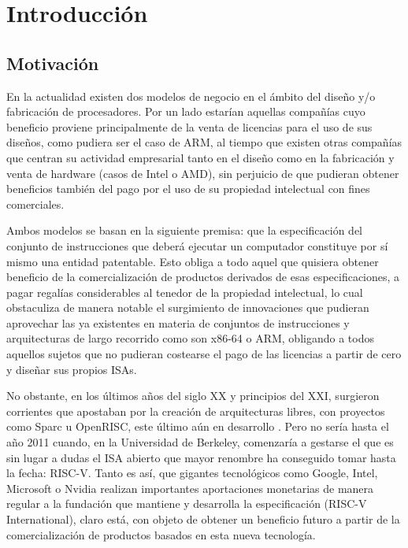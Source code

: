 \chapter{Introducción}


\section{Motivación}

En la actualidad existen dos modelos de negocio en el ámbito del diseño y/o fabricación de procesadores. Por un lado estarían aquellas compañías cuyo beneficio proviene principalmente de la venta de licencias para el uso de sus diseños, como pudiera ser el caso de ARM, al tiempo que existen otras compañías que centran su actividad empresarial tanto en el diseño como en la fabricación y venta de hardware (casos de Intel o AMD), sin perjuicio de que pudieran obtener beneficios también del pago por el uso de su propiedad intelectual con fines comerciales.

Ambos modelos se basan en la siguiente premisa: que la especificación del conjunto de instrucciones que deberá ejecutar un computador constituye por sí mismo una entidad patentable. Esto obliga a todo aquel que quisiera obtener beneficio de la comercialización de productos derivados de esas especificaciones, a pagar regalías considerables al tenedor de la propiedad intelectual, lo cual obstaculiza de manera notable el surgimiento de innovaciones que pudieran aprovechar las ya existentes en materia de conjuntos de instrucciones y arquitecturas de largo recorrido como son x86-64 o ARM, obligando a todos aquellos sujetos que no pudieran costearse el pago de las licencias a partir de cero y diseñar sus propios ISAs.

No obstante, en los últimos años del siglo XX y principios del XXI, surgieron corrientes que apostaban por la creación de arquitecturas libres, con proyectos como Sparc u OpenRISC, este último aún en desarrollo \cite{openrisc}. Pero no sería hasta el año 2011 \cite{geneology} cuando, en la Universidad de Berkeley, comenzaría a gestarse el que es sin lugar a dudas el ISA abierto que mayor renombre ha conseguido tomar hasta la fecha: RISC-V. Tanto es así, que gigantes tecnológicos como Google, Intel, Microsoft o Nvidia \cite{partners} realizan importantes aportaciones monetarias de manera regular a la fundación que mantiene y desarrolla la especificación (RISC-V International), claro está, con objeto de obtener un beneficio futuro a partir de la comercialización de productos basados en esta nueva tecnología.


